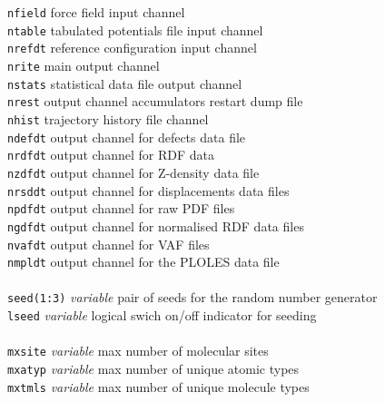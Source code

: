 \begin{tabbing}
\> {\tt nfield}                         \> force field input channel \\
\> {\tt ntable}                         \> tabulated potentials file input channel \\
\> {\tt nrefdt}                         \> reference configuration input channel \\
\> {\tt nrite}                           \> main output channel \\
\> {\tt nstats}                         \> statistical data file output channel \\
\> {\tt nrest}                          \> output channel accumulators restart dump file \\
\> {\tt nhist}                          \> trajectory history file channel \\
\> {\tt ndefdt}                         \> output channel for defects data file \\
\> {\tt nrdfdt}                         \> output channel for RDF data \\
\> {\tt nzdfdt}                         \> output channel for Z-density data file \\
\> {\tt nrsddt}                         \> output channel for displacements data files \\
\> {\tt npdfdt}                         \> output channel for raw PDF files \\
\> {\tt ngdfdt}                         \> output channel for normalised RDF data files \\
\> {\tt nvafdt}                         \> output channel for VAF files \\
\> {\tt nmpldt}                         \> output channel for the PLOLES data file \\
\>                   \>                      \> \\
\> {\tt seed(1:3)}   \> {\em variable}       \> pair of seeds for the random number generator \\
\> {\tt lseed}       \> {\em variable}       \> logical swich on/off indicator for seeding \\
\>                   \>                      \> \\
\> {\tt mxsite}      \> {\em variable}       \> max number of molecular sites \\
\> {\tt mxatyp}      \> {\em variable}       \> max number of unique atomic types \\
\> {\tt mxtmls}      \> {\em variable}       \> max number of unique molecule types \\

\end{tabbing}
